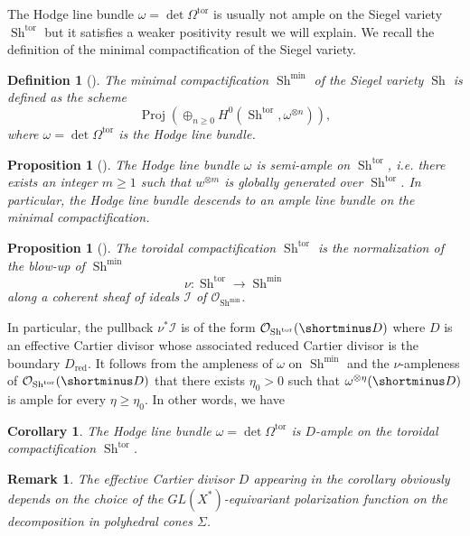 \documentclass[11pt]{amsart}
\numberwithin{subsection}{section}
\numberwithin{figure}{section}
\numberwithin{table}{section}
\theoremstyle{1}
\newtheorem{proposition}[theorem]{Proposition}
\newtheorem{corollary}[theorem]{Corollary}
\newtheorem{definition}[theorem]{Definition}
\theoremstyle{2}
\newtheorem{rmrk}[theorem]{Remark}
\DeclareMathOperator{\Sh}{Sh}
\DeclareMathOperator{\Proj}{Proj}
\DeclareMathOperator{\tor}{tor}
\DeclareMathOperator{\red}{red}
\begin{document}
The Hodge line bundle $\omega = \det \Omega^{\tor}$ is usually not ample on the Siegel variety $\Sh^{\tor}$ but it satisfies a weaker positivity result we will explain. We recall the definition of the minimal compactification of the Siegel variety.
\begin{definition}[{\cite[Chap. V]{MR1083353}}]\label{def4_sieg}
The minimal compactification $\Sh^{\min}$  of the Siegel variety $\Sh$ is defined as the scheme 
\begin{equation*}
\Proj(\oplus_{n\geq 0} H^0(\Sh^{\tor},\omega^{\otimes n})),
\end{equation*}
where $\omega = \det \Omega^{\tor}$ is the Hodge line bundle. 
\end{definition}
\begin{proposition}[{\cite[Chap. IX, Theorem 2.1, p. 208]{MR797982}}]\label{prop_sa}
The Hodge line bundle $\omega$ is semi-ample on $\Sh^{\tor}$, i.e. there exists an integer $m \geq 1$ such that $w^{\otimes m}$ is globally generated over $\Sh^{\tor}$. In particular, the Hodge line bundle descends to an ample line bundle on the minimal compactification.
\end{proposition}
\begin{proposition}[{\cite[Chap. V, Theorem 5.8]{MR1083353}}]
The toroidal compactification $\Sh^{\tor}$ is the normalization of the blow-up of $\Sh^{\min}$ 
\begin{equation*}
\nu : \Sh^{\tor} \rightarrow \Sh^{\min}
\end{equation*}
along a coherent sheaf of ideals $\mathcal{I}$ of $\mathcal{O}_{\Sh^{\min}}$.
\end{proposition}
\vspace*{0.2cm}
In particular, the pullback $\nu^*\mathcal{I}$ is of the form $\mathcal{O}_{\Sh^{\tor}}(\shortminus D)$ where $D$ is an effective Cartier divisor whose associated reduced Cartier divisor is the boundary $D_{\red}$. It follows from the ampleness of $\omega$ on $\Sh^{\min}$ and the $\nu$-ampleness of $\mathcal{O}_{\Sh^{\tor}}(\shortminus D)$ that there exists $\eta_0 > 0$ such that $\omega^{\otimes \eta}(\shortminus D)$ is ample for every $\eta \geq \eta_0$. In other words, we have
\begin{corollary}
The Hodge line bundle $\omega = \det \Omega^{\tor}$ is $D$-ample on the toroidal compactification $\Sh^{\tor}$.
\end{corollary}
\begin{rmrk}
The effective Cartier divisor $D$ appearing in the corollary obviously depends on the choice of the $GL(X^*)$-equivariant polarization function on the decomposition in polyhedral cones $\Sigma$.
\end{rmrk}
\end{document}
